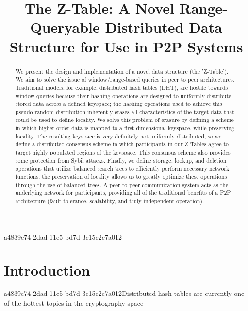\documentclass[12pt]{article}
\title{The Z-Table: A Novel Range-Queryable Distributed Data Structure for Use in P2P Systems}
\begin{document}
\maketitle

\begin{abstract}
We present the design and implementation of a novel data structure (the 'Z-Table'). We aim to solve the issue of window/range-based queries in peer to peer architectures. Traditional models, for example,  distributed hash tables (DHT), are hostile towards window queries because their hashing operations are designed to uniformly distribute stored data across a defined keyspace; the hashing operations used to achieve this pseudo-random distribution inherently erases all characteristics of the target data that could be used to define locality. We solve this problem of erasure by defining a scheme in which higher-order data is mapped to a first-dimensional keyspace, while preserving locality. The resulting keyspace is very definitely not uniformly distributed, so we define a distributed consensus scheme in which participants in our Z-Tables agree to target highly populated regions of the keyspace. This consensus scheme also provides some protection from Sybil attacks. Finally, we define storage, lookup, and deletion operations that utilize balanced search trees to efficiently perform necessary network functions; the preservation of locality allows us to greatly optimize these operations through the use of balanced trees. A peer to peer communication system acts as the underlying network for participants, providing all of the traditional benefits of a P2P architecture (fault tolerance, scalability, and truly independent operation).
\end{abstract}


a4839e74-2dad-11e5-bd7d-3c15c2c7a012\newpage
\section{Introduction}
a4839e74-2dad-11e5-bd7d-3c15c2c7a012Distributed hash tables are currently one of the hottest topics in the cryptography space~\cite{Stoica:2001dj,Rowstron:2001ea,Ratnasamy:2001wn}

\printbibliography
\end{document}
